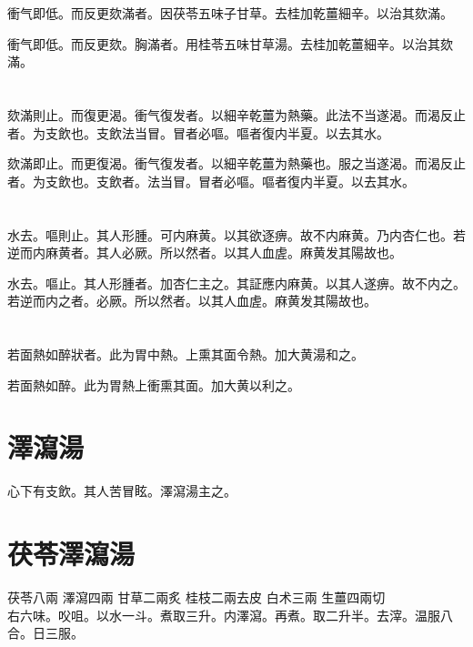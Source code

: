 衝气即低。而反更欬滿者。因茯苓五味子甘草。去桂加乾薑細辛。以治其欬滿。{\wuben}

衝气即低。而反更欬。胸滿者。用桂苓五味甘草湯。去桂加乾薑細辛。以治其欬滿。{\dengben}

\section{}

欬滿則止。而復更渴。衝气復发者。以細辛乾薑为熱藥。此法不当遂渴。而渴反止者。为支飲也。支飲法当冒。冒者必嘔。嘔者復内半夏。以去其水。{\wuben}

欬滿即止。而更復渴。衝气復发者。以細辛乾薑为熱藥也。服之当遂渴。而渴反止者。为支飲也。支飲者。法当冒。冒者必嘔。嘔者復内半夏。以去其水。{\dengben}

\section{}

水去。嘔則止。其人形腫。可内麻黄。以其欲逐痹。故不内麻黄。乃内杏仁也。若逆而内麻黄者。其人必厥。所以然者。以其人血虗。麻黄发其陽故也。{\wuben}

水去。嘔止。其人形腫者。加杏仁主之。其証應内麻黄。以其人遂痹。故不内之。若逆而内之者。必厥。所以然者。以其人血虗。麻黄发其陽故也。{\dengben}

\section{}

若面熱如醉狀者。此为胃中熱。上熏其面令熱。加大黄湯和之。{\wuben}

若面熱如醉。此为胃熱上衝熏其面。加大黄以利之。{\dengben}

\section{澤瀉湯}

心下有支飲。其人苦冒眩。澤瀉湯主之。

\section{茯苓澤瀉湯}

茯苓{\scriptsize 八兩} 澤瀉{\scriptsize 四兩} 甘草{\scriptsize 二兩炙} 桂枝{\scriptsize 二兩去皮} 白术{\scriptsize 三兩} 生薑{\scriptsize 四兩切}\\
右六味。㕮咀。以水一斗。煮取三升。内澤瀉。再煮。取二升半。去滓。温服八合。日三服。

